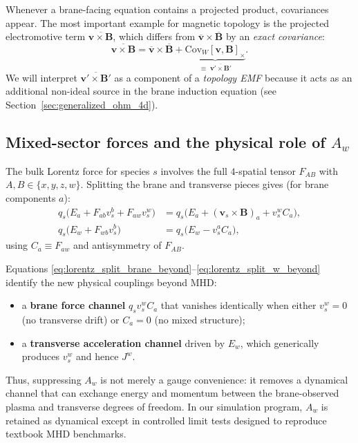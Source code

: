 \documentclass[11pt]{article}
\begin{document}
Whenever a brane-facing equation contains a projected product, covariances appear.
The most important example for magnetic topology is the projected electromotive term
\(\overline{\mathbf{v}\times\mathbf{B}}\), which differs from
\(\overline{\mathbf{v}}\times\overline{\mathbf{B}}\) by an \emph{exact covariance}:
\begin{equation}
\overline{\mathbf{v}\times\mathbf{B}}
=
\overline{\mathbf{v}}\times\overline{\mathbf{B}}
+
\underbrace{\mathrm{Cov}_W[\mathbf{v},\mathbf{B}]_{\times}}_{\equiv\;\overline{\mathbf{v}'\times\mathbf{B}'}}.
\label{eq:EMF_cov_identity_beyond}
\end{equation}
We will interpret \(\overline{\mathbf{v}'\times\mathbf{B}'}\) as a component of a
\emph{topology EMF} because it acts as an additional non-ideal source in the brane induction
equation (see Section~\ref{sec:generalized_ohm_4d}).

\subsection{Mixed-sector forces and the physical role of \(A_w\)}
\label{sec:mixed_sector_forces}

The bulk Lorentz force for species \(s\) involves the full \(4\)-spatial tensor
\(F_{AB}\) with \(A,B\in\{x,y,z,w\}\). Splitting the brane and transverse pieces gives
(for brane components \(a\)):
\begin{align}
q_s\Big(E_a + F_{ab}v_s^b + F_{aw}v_s^w\Big)
&=
q_s\Big(E_a + (\mathbf{v}_s\times\mathbf{B})_a + v_s^w C_a\Big),
\label{eq:lorentz_split_brane_beyond}
\\
q_s\Big(E_w + F_{wb}v_s^b\Big)
&=
q_s\Big(E_w - v_s^a C_a\Big),
\label{eq:lorentz_split_w_beyond}
\end{align}
using \(C_a\equiv F_{aw}\) and antisymmetry of \(F_{AB}\).

Equations \eqref{eq:lorentz_split_brane_beyond}--\eqref{eq:lorentz_split_w_beyond} identify
the new physical couplings beyond MHD:
\begin{itemize}[leftmargin=1.7em]
\item a \textbf{brane force channel} \(q_s v_s^w C_a\) that vanishes identically when either
\(v_s^w=0\) (no transverse drift) or \(C_a=0\) (no mixed structure);
\item a \textbf{transverse acceleration channel} driven by \(E_w\), which generically produces
\(v_s^w\) and hence \(J^w\).
\end{itemize}

Thus, suppressing \(A_w\) is not merely a gauge convenience: it removes a dynamical channel
that can exchange energy and momentum between the brane-observed plasma and transverse degrees
of freedom. In our simulation program, \(A_w\) is retained as dynamical except in controlled
limit tests designed to reproduce textbook MHD benchmarks.
\end{document}
